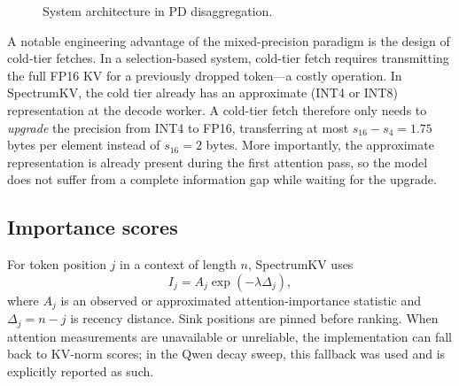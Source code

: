 \documentclass[11pt]{article}
\newcommand{\method}{SpectrumKV}
\newcommand{\fp}{\textsc{fp16}}
\theoremstyle{plain}
\theoremstyle{definition}
\begin{document}
\begin{figure}[H]
{%
}
\caption{System architecture in PD disaggregation.}
\label{fig:sysarch}
\end{figure}

A notable engineering advantage of the mixed-precision paradigm is the design of cold-tier fetches.  In a selection-based system, cold-tier fetch requires transmitting the full FP16 KV for a previously dropped token---a costly operation.  In \method{}, the cold tier already has an approximate (INT4 or INT8) representation at the decode worker.  A cold-tier fetch therefore only needs to \emph{upgrade} the precision from INT4 to FP16, transferring at most $s_{16}-s_4 = 1.75$ bytes per element instead of $s_{16} = 2$ bytes.  More importantly, the approximate representation is already present during the first attention pass, so the model does not suffer from a complete information gap while waiting for the upgrade.

\subsection{Importance scores}
For token position $j$ in a context of length $n$, \method{} uses
\begin{equation}
  I_j = A_j \exp(-\lambda \Delta_j),
  \label{eq:importance}
\end{equation}
where $A_j$ is an observed or approximated attention-importance statistic and $\Delta_j=n-j$ is recency distance.  Sink positions are pinned before ranking.  When attention measurements are unavailable or unreliable, the implementation can fall back to KV-norm scores; in the Qwen decay sweep, this fallback was used and is explicitly reported as such.
\end{document}
